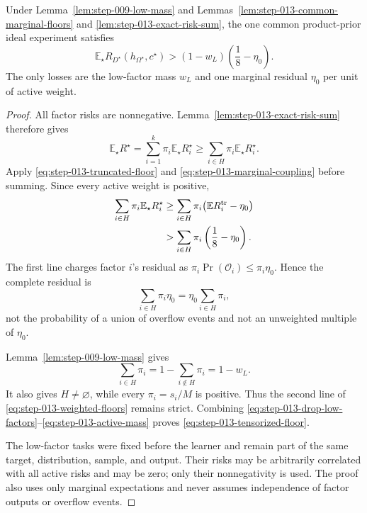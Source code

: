 \begin{proposition}
\label{prop:step-013-tensorization}
Under Lemma~\ref{lem:step-009-low-mass} and
Lemmas~\ref{lem:step-013-common-marginal-floors} and
\ref{lem:step-013-exact-risk-sum}, the one common product-prior ideal
experiment satisfies
\begin{equation}\label{eq:step-013-tensorized-floor}
\mathbb E_\star
R_{D^\star}(h_{\Omega^\star},c^\star)
>(1-w_L)\left(\frac18-\eta_0\right).
\end{equation}
The only losses are the low-factor mass \(w_L\) and one marginal
residual \(\eta_0\) per unit of active weight.
\end{proposition}

\begin{proof}
All factor risks are nonnegative.  Lemma~\ref{lem:step-013-exact-risk-sum}
therefore gives
\begin{equation}\label{eq:step-013-drop-low-factors}
\mathbb E_\star R^\star
=\sum_{i=1}^k\pi_i\mathbb E_\star R_i^\star
\ge\sum_{i\in H}\pi_i\mathbb E_\star R_i^\star.
\end{equation}
Apply \eqref{eq:step-013-truncated-floor} and
\eqref{eq:step-013-marginal-coupling} before summing.  Since every
active weight is positive,
\begin{align}
\sum_{i\in H}\pi_i\mathbb E_\star R_i^\star
&\ge
  \sum_{i\in H}\pi_i
  \bigl(\mathbb E R_i^{\rm tr}-\eta_0\bigr)
\notag\\
&>
  \sum_{i\in H}\pi_i
  \left(\frac18-\eta_0\right).
\label{eq:step-013-weighted-floors}
\end{align}
The first line charges factor \(i\)'s residual as
\(\pi_i\Pr(\mathcal O_i)\le\pi_i\eta_0\).  Hence the complete residual
is
\begin{equation}\label{eq:step-013-weighted-residual}
\sum_{i\in H}\pi_i\eta_0
=\eta_0\sum_{i\in H}\pi_i,
\end{equation}
not the probability of a union of overflow events and not an unweighted
multiple of \(\eta_0\).

Lemma~\ref{lem:step-009-low-mass} gives
\begin{equation}\label{eq:step-013-active-mass}
\sum_{i\in H}\pi_i
=1-\sum_{i\notin H}\pi_i
=1-w_L.
\end{equation}
It also gives \(H\ne\varnothing\), while every
\(\pi_i=s_i/M\) is positive.  Thus the second line of
\eqref{eq:step-013-weighted-floors} remains strict.  Combining
\eqref{eq:step-013-drop-low-factors}--\eqref{eq:step-013-active-mass}
proves \eqref{eq:step-013-tensorized-floor}.

The low-factor tasks were fixed before the learner and remain part of
the same target, distribution, sample, and output.  Their risks may be
arbitrarily correlated with all active risks and may be zero; only
their nonnegativity is used.  The proof also uses only marginal
expectations and never assumes independence of factor outputs or
overflow events.
\end{proof}

